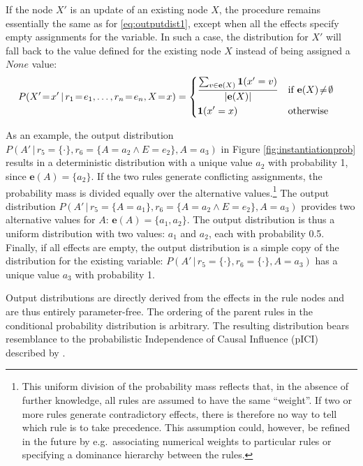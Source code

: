 If the node $X'$ is an update of an existing node $X$, the procedure remains essentially the same as for \eqref{eq:outputdist1}, except when all the effects specify empty assignments for the variable. In such a case, the distribution for $X'$ will fall back to the value defined for the existing node $X$ instead of being assigned a $\mathit{None}$ value:
\begin{align}
&P(X'\!=\!x' \, | \, r_1\!=\!e_1, \dots, r_n\!=\!e_n, X\!=\!x) = \begin{dcases} 
\frac{\sum_{v \in {\mathbf{e}(X)}} \mathbf{1}(x' = v)} { |\mathbf{e}(X)| }  & \text{if } \mathbf{e}(X)\!\neq\!\emptyset \\
\mathbf{1}(x' = x) & \text{otherwise}
\end{dcases}\label{eq:outputdist2}
\end{align}

As an example, the output distribution $P(A' \, | \, r_5\!=\!\{\cdot\},r_6\!=\!\{A\!=\!a_2 \land E\!=\!e_2\}, A\!=\!a_3)$ in Figure \ref{fig:instantiationprob} results in a deterministic distribution with a unique value $a_2$ with probability 1, since $\mathbf{e}(A) = \{a_2\}$. If the two rules generate conflicting assignments, the probability mass is divided equally over the alternative values.\footnote{This uniform division of the probability mass reflects that, in the absence of further knowledge, all rules are assumed to have the same ``weight''. If two or more rules generate contradictory effects, there is therefore no way to tell which rule is to take precedence. This assumption could, however, be refined in the future by e.g.\ associating numerical weights to particular rules or specifying a dominance hierarchy between the rules.}   The output distribution $P(A' \, | \, r_5\!=\!\{A\!=\!a_1\},r_6\!=\!\{A\!=\!a_2 \land E\!=\!e_2\}, A\!=\!a_3)$ provides two alternative values for $A$: $\mathbf{e}(A) = \{a_1,a_2\}$. The output distribution is thus a uniform distribution with two values: $a_1$ and $a_2$, each with probability 0.5. Finally, if all effects are empty, the output distribution is a simple copy of the distribution for the existing variable: $P(A' \, | \, r_5\!=\!\{\cdot\},r_6\!=\!\{\cdot\}, A\!=\!a_3)$ has a unique value $a_3$ with probability 1. 

Output distributions are directly derived from the effects in the rule nodes and are thus entirely parameter-free.  The ordering of the parent rules in the conditional probability distribution is arbitrary. The resulting distribution bears resemblance to the probabilistic Independence of Causal Influence (pICI) described by \cite{diez06}. 


